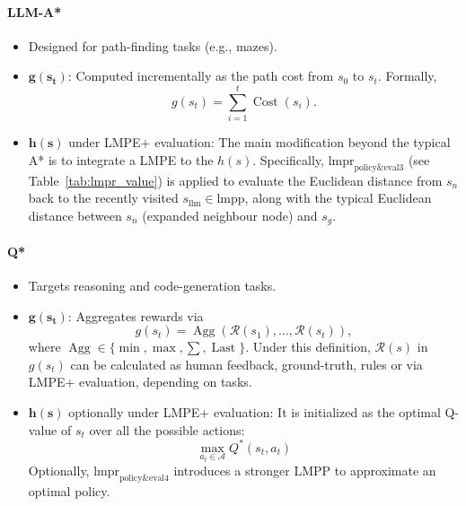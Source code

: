 \paragraph{LLM-A* \citep{meng2024llm}}
\begin{itemize}
    \item Designed for path-finding tasks (e.g., mazes).
    \item \(\boldsymbol{g(s_t)}\): Computed incrementally as the path cost from \(s_0\) to \(s_t\). Formally,
    \begin{equation} 
        g(s_t) = \sum_{i=1}^{t} \operatorname{Cost}(s_i).
        \label{eq:gs_llm_a_star} 
    \end{equation}
    
    \item \(\boldsymbol{h(s)}\) under LMPE+ evaluation:
    The main modification beyond the typical A* is to integrate a LMPE to the $h(s)$.  Specifically, $\text{lmpr}_\text{policy\&eval3}$ (see Table~\ref{tab:lmpr_value}) is applied to evaluate the Euclidean distance from $s_n$ back to the recently visited $s_\text{llm} \in \text{lmpp}$, along with the typical Euclidean distance between $s_n$ (expanded neighbour node) and $s_g$.
\end{itemize}

\paragraph{Q* \citep{wang2024q}}
\begin{itemize}
    \item Targets reasoning and code-generation tasks.
    
    \item \(\boldsymbol{g(s_t)}\): Aggregates rewards via 
    \begin{equation}
        g(s_t) = \operatorname{Agg}\left(\mathcal{R}(s_1), \ldots, \mathcal{R}(s_t)\right),
        \label{eq:gs_q_star}
    \end{equation}
    where $\operatorname{Agg} \in \{\min , \max , \sum, \operatorname{Last} \}$.  Under this definition, $\mathcal{R}\left(s\right)$ in $g(s_t)$ can be calculated as human feedback, ground-truth, rules or via LMPE+ evaluation, depending on tasks.
    
    \item \(\boldsymbol{h(s)}\) optionally under LMPE+ evaluation: It is initialized as the optimal Q-value of $s_t$ over all the possible actions:
    \begin{equation}
        \max _{a_t \in \mathcal{A}} Q^*\left(s_t, a_t\right)
        \label{eq:q_value_as_heuristic}
    \end{equation}
    Optionally, \(\text{lmpr}_\text{policy\&eval4}\) introduces a stronger LMPP to approximate an optimal policy.
\end{itemize}

